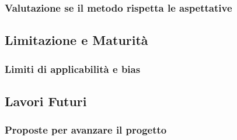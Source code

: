 \documentclass[12pt,a4paper,twoside]{article}
\begin{document}
\subsubsection{Valutazione se il metodo rispetta le aspettative}

\subsection{Limitazione e Maturità}
\subsubsection{Limiti di applicabilità e bias}

\subsection{Lavori Futuri}
\subsubsection{Proposte per avanzare il progetto}

\newpage

\printbibliography
\end{document}
